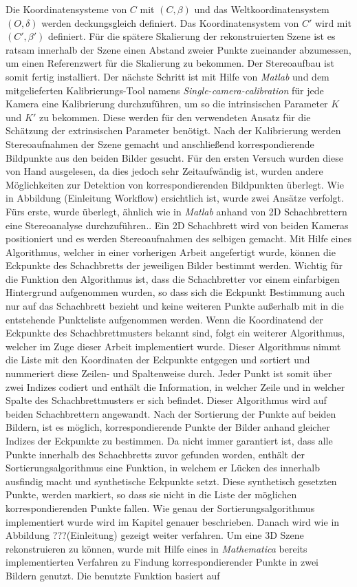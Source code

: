Die Koordinatensysteme von $C$ mit $(C, \beta)$ und das Weltkoordinatensystem $(O,\delta)$ werden deckungsgleich definiert. Das Koordinatensystem von $C'$ wird mit $(C', \beta')$ definiert. Für die spätere Skalierung der rekonstruierten Szene ist es ratsam innerhalb der Szene einen Abstand zweier Punkte zueinander abzumessen, um einen Referenzwert für die Skalierung zu bekommen. Der Stereoaufbau ist somit fertig installiert. Der nächste Schritt ist mit Hilfe von \textit{Matlab} und dem mitgelieferten Kalibrierungs-Tool namens \textit{Single-camera-calibration} für jede Kamera eine Kalibrierung durchzuführen, um so  die intrinsischen Parameter $K$ und $K'$ zu bekommen. Diese werden für den verwendeten Ansatz für die Schätzung der extrinsischen Parameter benötigt. Nach der Kalibrierung werden Stereoaufnahmen der Szene gemacht und anschließend korrespondierende Bildpunkte aus den beiden Bilder gesucht. Für den ersten Versuch wurden diese von Hand ausgelesen, da dies jedoch sehr Zeitaufwändig ist, wurden andere Möglichkeiten zur Detektion von korrespondierenden Bildpunkten überlegt. Wie in Abbildung (Einleitung Workflow) ersichtlich ist, wurde zwei Ansätze verfolgt. Fürs erste, wurde überlegt, ähnlich wie in \textit{Matlab} anhand von 2D Schachbrettern eine Stereoanalyse durchzuführen.\cite{MatlabStereoApp}. Ein 2D Schachbrett wird von beiden Kameras positioniert und es werden Stereoaufnahmen des selbigen gemacht. Mit Hilfe eines Algorithmus, welcher in einer vorherigen Arbeit angefertigt wurde, können die Eckpunkte des Schachbretts der jeweiligen Bilder bestimmt werden. Wichtig für die Funktion den Algorithmus ist, dass die Schachbretter vor einem einfarbigen Hintergrund aufgenommen wurden, so dass sich die Eckpunkt Bestimmung auch nur auf das Schachbrett bezieht und keine weiteren Punkte außerhalb mit in die entstehende Punkteliste aufgenommen werden. Wenn die Koordinatend der Eckpunkte des Schachbrettmusters bekannt sind, folgt ein weiterer Algorithmus, welcher im Zuge dieser Arbeit implementiert wurde. Dieser Algorithmus nimmt die Liste mit den Koordinaten der Eckpunkte entgegen und sortiert und nummeriert diese Zeilen- und Spaltenweise durch. Jeder Punkt ist somit über zwei Indizes codiert und enthält die Information, in welcher Zeile und in welcher Spalte des Schachbrettmusters er sich befindet. Dieser Algorithmus wird auf beiden Schachbrettern angewandt. Nach der Sortierung der Punkte auf beiden Bildern, ist es möglich, korrespondierende Punkte der Bilder anhand gleicher Indizes der Eckpunkte zu bestimmen. Da nicht immer garantiert ist, dass alle Punkte innerhalb des Schachbretts zuvor gefunden worden, enthält der Sortierungsalgorithmus eine Funktion, in welchem er Lücken des innerhalb ausfindig macht und synthetische Eckpunkte setzt. Diese synthetisch gesetzten Punkte, werden markiert, so dass sie nicht in die Liste der möglichen korrespondierenden Punkte fallen. Wie genau der Sortierungsalgorithmus implementiert wurde wird im Kapitel  genauer beschrieben. Danach wird wie in Abbildung ???(Einleitung) gezeigt weiter verfahren. Um eine 3D Szene rekonstruieren zu können, wurde mit Hilfe eines in \textit{Mathematica} bereits implementierten Verfahren zu Findung korrespondierender Punkte in zwei Bildern genutzt. Die benutzte Funktion basiert auf 